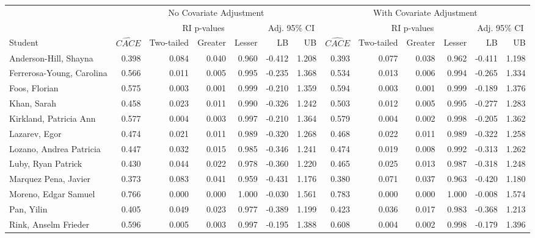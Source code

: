 \documentclass[11pt,notitlepage]{article}
\begin{document}
\begin{table}[h!]\footnotesize\doublespacing
\begin{center}
\begin{tabular}{lrrrrrr|rrrrrr}
  \hline
  & \multicolumn{6}{c|}{No Covariate Adjustment} & \multicolumn{6}{c}{With Covariate Adjustment} \\
  \cline{2-13}
  & & \multicolumn{3}{c}{RI p-values} & \multicolumn{2}{c|}{Adj. 95\% CI} &  & \multicolumn{3}{c}{RI p-values} & \multicolumn{2}{c}{Adj. 95\% CI} \\
  \cline{3-5}\cline{9-11}
Student & $\widehat{CACE}$ & Two-tailed & Greater & Lesser & LB & UB & $\widehat{CACE}$ & Two-tailed & Greater & Lesser & LB & UB \\ 
  \hline
Anderson-Hill, Shayna & 0.398 & 0.084 & 0.040 & 0.960 & -0.412 & 1.208 & 0.393 & 0.077 & 0.038 & 0.962 & -0.411 & 1.198 \\ 
  Ferrerosa-Young, Carolina & 0.566 & 0.011 & 0.005 & 0.995 & -0.235 & 1.368 & 0.534 & 0.013 & 0.006 & 0.994 & -0.265 & 1.334 \\ 
  Foos, Florian & 0.575 & 0.003 & 0.001 & 0.999 & -0.210 & 1.359 & 0.594 & 0.003 & 0.001 & 0.999 & -0.189 & 1.376 \\ 
  Khan, Sarah & 0.458 & 0.023 & 0.011 & 0.990 & -0.326 & 1.242 & 0.503 & 0.012 & 0.005 & 0.995 & -0.277 & 1.283 \\ 
  Kirkland, Patricia Ann & 0.577 & 0.004 & 0.003 & 0.997 & -0.210 & 1.364 & 0.579 & 0.004 & 0.002 & 0.998 & -0.205 & 1.362 \\ 
  Lazarev, Egor & 0.474 & 0.021 & 0.011 & 0.989 & -0.320 & 1.268 & 0.468 & 0.022 & 0.011 & 0.989 & -0.322 & 1.258 \\ 
  Lozano, Andrea Patricia & 0.447 & 0.032 & 0.015 & 0.985 & -0.346 & 1.241 & 0.474 & 0.019 & 0.008 & 0.992 & -0.313 & 1.262 \\ 
  Luby, Ryan Patrick & 0.430 & 0.044 & 0.022 & 0.978 & -0.360 & 1.220 & 0.465 & 0.025 & 0.013 & 0.987 & -0.318 & 1.248 \\ 
  Marquez Pena, Javier & 0.373 & 0.083 & 0.041 & 0.959 & -0.431 & 1.176 & 0.380 & 0.071 & 0.037 & 0.963 & -0.420 & 1.180 \\ 
  Moreno, Edgar Samuel & 0.766 & 0.000 & 0.000 & 1.000 & -0.030 & 1.561 & 0.783 & 0.000 & 0.000 & 1.000 & -0.008 & 1.574 \\ 
  Pan, Yilin & 0.405 & 0.049 & 0.023 & 0.977 & -0.389 & 1.199 & 0.423 & 0.036 & 0.017 & 0.983 & -0.368 & 1.213 \\ 
  Rink, Anselm Frieder & 0.596 & 0.005 & 0.003 & 0.997 & -0.195 & 1.388 & 0.608 & 0.004 & 0.002 & 0.998 & -0.179 & 1.396 \\ 

\end{tabular}
\end{center}
\end{table}
\end{document}
